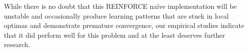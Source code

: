 \documentclass[a4paper, 12pt]{article}
\newcommand{\rowspace}[1]{\renewcommand{\arraystretch}{#1}}
\begin{document}
While there is no doubt that this REINFORCE na\"ive implementation will be unstable and occasionally produce learning patterns that are stuck in local optimas and demonstrate premature convergence, our empirical studies indicate that it did perform well for this problem and at the least deserves further research.
%		
%		
\end{document}

